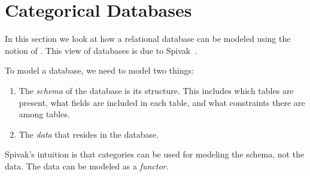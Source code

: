 
\section{Categorical Databases}
\label{sec:functors-categorical-db}

In this section we look at how a relational database can be modeled using the notion of .
This view of databases is due to Spivak~\cite{spivak2019categorical,spivak2012ologs,}.

To model a database, we need to model two things:
\begin{enumerate}
    \item The \emph{schema} of the database is its structure.
          This includes which tables are present,
          what fields are included in each table, and what constraints there are among tables.
    \item The \emph{data} that resides in the database.
\end{enumerate}

Spivak's intuition is that categories can be used for modeling the schema, not the data.
The data can be modeled as a \emph{functor}.

